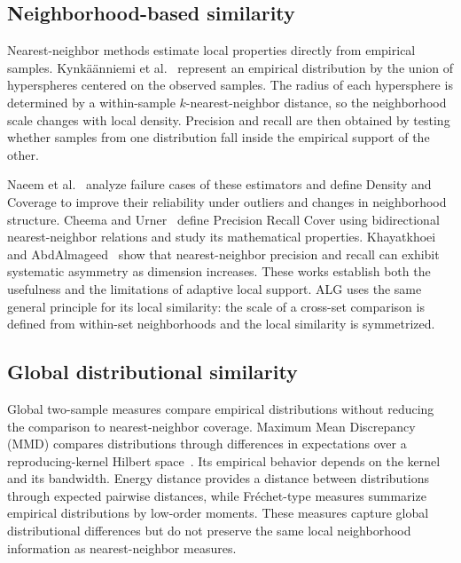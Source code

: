\documentclass[preprint,12pt]{elsarticle}
\begin{document}
\subsection{Neighborhood-based similarity}

Nearest-neighbor methods estimate local properties directly from empirical
samples. Kynk\"a\"anniemi et al.~\cite{kynkaanniemi2019precision} represent an
empirical distribution by the union of hyperspheres centered on the observed
samples. The radius of each hypersphere is determined by a within-sample
$k$-nearest-neighbor distance, so the neighborhood scale changes with local
density. Precision and recall are then obtained by testing whether samples from
one distribution fall inside the empirical support of the other.

Naeem et al.~\cite{naeem2020reliable} analyze failure cases of these estimators
and define Density and Coverage to improve their reliability under outliers and
changes in neighborhood structure. Cheema and Urner~\cite{cheema2023prc} define
Precision Recall Cover using bidirectional nearest-neighbor relations and study
its mathematical properties. Khayatkhoei and
AbdAlmageed~\cite{khayatkhoei2023asymmetry} show that nearest-neighbor precision
and recall can exhibit systematic asymmetry as dimension increases. These works
establish both the usefulness and the limitations of adaptive local support.
ALG uses the same general principle for its local similarity: the scale of a
cross-set comparison is defined from within-set neighborhoods and the local
similarity is symmetrized.

\subsection{Global distributional similarity}

Global two-sample measures compare empirical distributions without reducing the
comparison to nearest-neighbor coverage. Maximum Mean Discrepancy (MMD) compares
distributions through differences in expectations over a reproducing-kernel
Hilbert space~\cite{gretton2012mmd,sriperumbudur2010embeddings}. Its empirical
behavior depends on the kernel and its bandwidth. Energy distance provides a
distance between distributions through expected pairwise distances, while
Fr\'echet-type measures summarize empirical distributions by low-order moments.
These measures capture global distributional differences but do not preserve
the same local neighborhood information as nearest-neighbor measures.
\end{document}
